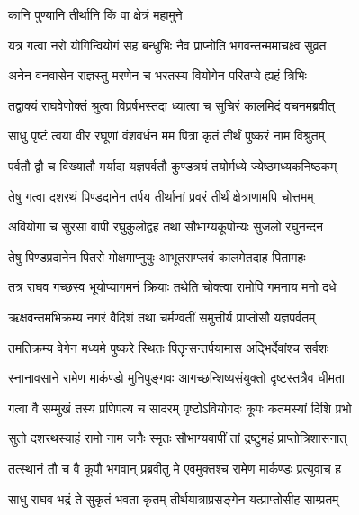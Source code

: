 


\onelineshloka
{कानि पुण्यानि तीर्थानि किं वा क्षेत्रं महामुने} %

\twolineshloka
{यत्र गत्वा नरो योगिन्वियोगं सह बन्धुभिः}
{नैव प्राप्नोति भगवन्तन्ममाचक्ष्व सुव्रत} %

\twolineshloka
{अनेन वनवासेन राज्ञस्तु मरणेन च}
{भरतस्य वियोगेन परितप्ये ह्यहं त्रिभिः} %

\twolineshloka
{तद्वाक्यं राघवेणोक्तं श्रुत्वा विप्रर्षभस्तदा}
{ध्यात्वा च सुचिरं कालमिदं वचनमब्रवीत्} %



\twolineshloka
{साधु पृष्टं त्वया वीर रघूणां वंशवर्धन}
{मम पित्रा कृतं तीर्थं पुष्करं नाम विश्रुतम्} %

\twolineshloka
{पर्वतौ द्वौ च विख्यातौ मर्यादा यज्ञपर्वतौ}
{कुण्डत्रयं तयोर्मध्ये ज्येष्ठमध्यकनिष्ठकम्} %

\twolineshloka
{तेषु गत्वा दशरथं पिण्डदानेन तर्पय}
{तीर्थानां प्रवरं तीर्थं क्षेत्राणामपि चोत्तमम्} %

\twolineshloka
{अवियोगा च सुरसा वापी रघुकुलोद्वह}
{तथा सौभाग्यकूपोन्यः सुजलो रघुनन्दन} %

\twolineshloka
{तेषु पिण्डप्रदानेन पितरो मोक्षमाप्नुयुः}
{आभूतसम्प्लवं कालमेतदाह पितामहः} %

\twolineshloka
{तत्र राघव गच्छस्व भूयोप्यागमनं क्रियाः}
{तथेति चोक्त्वा रामोपि गमनाय मनो दधे} %

\twolineshloka
{ऋक्षवन्तमभिक्रम्य नगरं वैदिशं तथा}
{चर्मण्वतीं समुत्तीर्य प्राप्तोसौ यज्ञपर्वतम्} %

\twolineshloka
{तमतिक्रम्य वेगेन मध्यमे पुष्करे स्थितः}
{पितॄन्सन्तर्पयामास अद्भिर्देवांश्च सर्वशः} %

\twolineshloka
{स्नानावसाने रामेण मार्कण्डो मुनिपुङ्गवः}
{आगच्छन्शिष्यसंयुक्तो दृष्टस्तत्रैव धीमता} %

\twolineshloka
{गत्वा वै सम्मुखं तस्य प्रणिपत्य च सादरम्}
{पृष्टोऽवियोगदः कूपः कतमस्यां दिशि प्रभो} %

\twolineshloka
{सुतो दशरथस्याहं रामो नाम जनैः स्मृतः}
{सौभाग्यवापीं तां द्रष्टुमहं प्राप्तोत्रिशासनात्} %

\twolineshloka
{तत्स्थानं तौ च वै कूपौ भगवान् प्रब्रवीतु मे}
{एवमुक्तश्च रामेण मार्कण्डः प्रत्युवाच ह} %

\twolineshloka
{साधु राघव भद्रं ते सुकृतं भवता कृतम्}
{तीर्थयात्राप्रसङ्गेन यत्प्राप्तोसीह साम्प्रतम्} %

